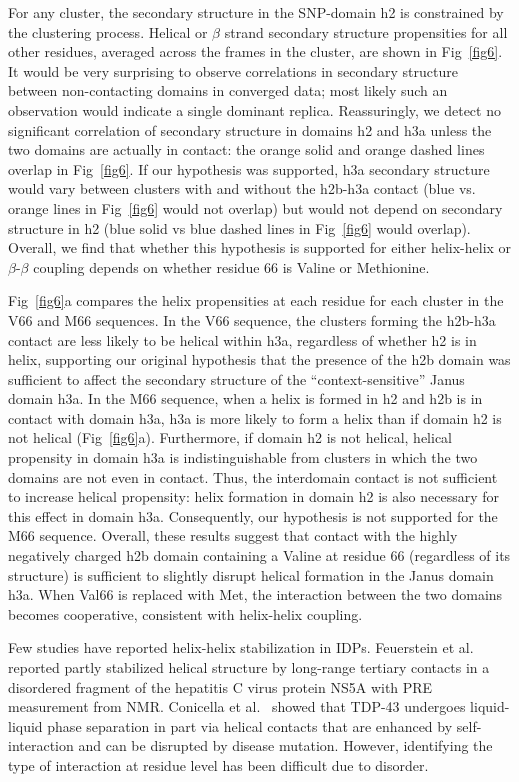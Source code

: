 \documentclass[10pt,letterpaper]{article}
\begin{document}
For any cluster, the secondary structure in the SNP-domain h2 is constrained by the clustering process. Helical or $\beta$ strand secondary structure propensities for all other residues, averaged across the frames in the cluster, are shown in Fig~\ref{fig6}. It would be very surprising to observe correlations in secondary structure between non-contacting domains in converged data; most likely such an observation would indicate a single dominant replica. Reassuringly, we detect no significant correlation of secondary structure in domains h2 and h3a unless the two domains are actually in contact: the orange solid and orange dashed lines overlap in Fig~\ref{fig6}. If our hypothesis was supported, h3a secondary structure would vary between clusters with and without the h2b-h3a contact (blue vs. orange lines in Fig~\ref{fig6} would not overlap) but would not depend on secondary structure in h2 (blue solid vs blue dashed lines in Fig~\ref{fig6} would overlap). Overall, we find that whether this hypothesis is supported for either helix-helix or $\beta$-$\beta$ coupling depends on whether residue 66 is Valine or Methionine.  


Fig~\ref{fig6}a compares the helix propensities at each residue for each cluster in the V66 and M66 sequences. In the V66 sequence, the clusters forming the h2b-h3a contact are less likely to be helical within h3a, regardless of whether h2 is in helix, supporting our original hypothesis that the presence of the h2b domain was sufficient to affect the secondary structure of the ``context-sensitive'' Janus domain h3a. In the M66 sequence, when a helix is formed in h2 and h2b is in contact with domain h3a, h3a is more likely to form a helix than if domain h2 is not helical (Fig~\ref{fig6}a). Furthermore, if domain h2 is not helical, helical propensity in domain h3a is indistinguishable from clusters in which the two domains are not even in contact. Thus, the interdomain contact is not sufficient to increase helical propensity: helix formation in domain h2 is also necessary for this effect in domain h3a. Consequently, our hypothesis is not supported for the M66 sequence. Overall, these results suggest that contact with the highly negatively charged h2b domain containing a Valine at residue 66 (regardless of its structure) is sufficient to slightly disrupt helical formation in the Janus domain h3a. When Val66 is replaced with Met, the interaction between the two domains becomes cooperative, consistent with helix-helix coupling.  

Few studies have reported helix-helix stabilization in IDPs. Feuerstein et al.~\cite{Feuerstein2012} reported partly stabilized helical structure by long-range tertiary contacts in a disordered fragment of the hepatitis C virus protein NS5A with PRE measurement from NMR. Conicella et al.~\cite{AlexanderConicella2016} showed that TDP-43 undergoes liquid-liquid phase separation in part via helical contacts that are enhanced by self-interaction and can be disrupted by disease mutation. However, identifying the type of interaction at residue level has been difficult due to disorder.
\end{document}
